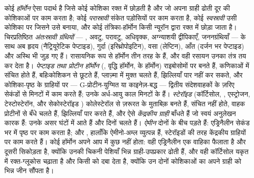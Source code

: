 \begin{definition}[हॉर्मोन]\label{def:b3:endocrinology:hormone}
कोई \emph{हॉर्मोन} ऐसा पदार्थ है जिसे कोई कोशिका रक्त में छोड़ती है और
जो अपना ग्राही ढोती दूर की कोशिकाओं पर काम करता है; कोई
\emph{परास्रावी} संकेत पड़ोसियों पर काम करता है, कोई \emph{स्वस्रावी}
उसी कोशिका पर जिसने उसे बनाया, और कोई तंत्रिका-हॉर्मोन किसी न्यूरॉन
द्वारा रक्त में छोड़ा जाता है। चिरप्रतिष्ठित \emph{अंतःस्रावी
ग्रंथियों} --- , अवटु, परावटु, अधिवृक्क, अग्न्याशयी द्वीपिकाएँ,
जननग्रंथियाँ --- के साथ अब हृदय (नैट्रियूरेटिक पेप्टाइड), गुर्दा
(इरिथ्रोपोइटिन), वसा (लेप्टिन), आँत (दर्जन भर पेप्टाइड) और अस्थि भी जुड़
गए हैं। रासायनिक रूप से हॉर्मोन तीन तरह के हैं, और वही रसायन उनका तंत्र
तय कर देता है। \emph{पेप्टाइड तथा प्रोटीन हॉर्मोन} (, वृद्धि
हॉर्मोन,  के हॉर्मोन) राइबोसोमों पर बनते हैं, कणिकाओं में संचित
होते हैं, बहिःकोशिकन से छूटते हैं, प्लाज़्मा में मुक्त चलते हैं,
झिल्लियाँ पार नहीं कर सकते, और कोशिका-पृष्ठ के ग्राहियों पर ---
G-प्रोटीन-युग्मित या काइनेज़-बद्ध --- द्वितीय संदेशवाहकों के ज़रिए
सेकंडों से मिनटों में काम करते हैं; उनके अर्ध-आयु काल मिनटों के हैं।
\emph{स्टेरॉइड} (कॉर्टिसोल, , एस्ट्रोजन, टेस्टोस्टेरॉन,
और सेकोस्टेरॉइड ) कोलेस्टेरॉल से ज़रूरत के मुताबिक़ बनते हैं,
संचित नहीं होते, वाहक प्रोटीनों से बँधे चलते हैं, झिल्लियाँ पार करते
हैं, और ऐसे \emph{केंद्रकीय ग्राही} बाँधते हैं जो स्वयं अनुलेखन कारक
हैं: उनके असर घंटों में आते हैं और दिनों चलते हैं।
\emph{ऐमीन} दोनों के बीच पड़ते हैं: एड्रिनैलीन सेकंड भर में पृष्ठ पर काम
करता है; और , हालाँकि ऐमीनो-अम्ल व्युत्पन्न हैं,
स्टेरॉइडों की तरह केंद्रकीय ग्राहियों पर काम करते हैं। कोई हॉर्मोन अपने
आप में कुछ नहीं होता: वही एड्रिनैलीन एक वाहिका फैलाता है और दूसरी
सिकोड़ता है, क्योंकि उनकी चिकनी पेशियाँ भिन्न ग्राही-उपप्रकार ढोती हैं,
और वही कॉर्टिसोल यकृत में रक्त-ग्लूकोस चढ़ाता है और किसी  को दबा
देता है, क्योंकि उन दोनों कोशिकाओं का  अपने ग्राही को भिन्न
जीन सौंपता है।
\end{definition}

